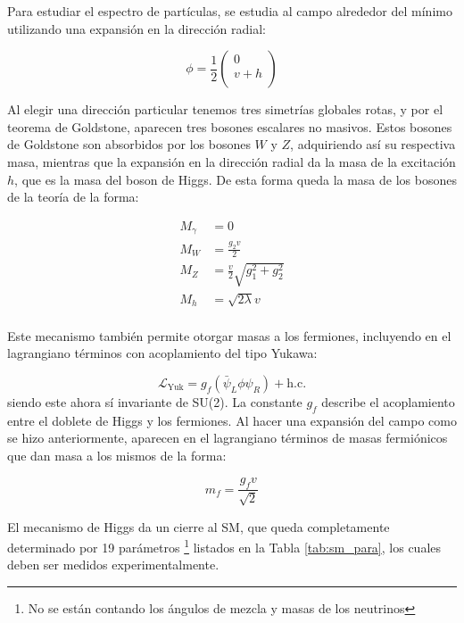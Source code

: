 Para estudiar el espectro de partículas, se estudia al campo alrededor del mínimo utilizando una expansión en la dirección radial:

\begin{equation}
	\phi = \frac{1}{2}
	\begin{pmatrix}
	0 \\
	v + h \\
	\end{pmatrix}
\end{equation}

Al elegir una dirección particular tenemos tres simetrías globales rotas, y por el teorema de Goldstone, aparecen tres bosones escalares no masivos. Estos bosones de Goldstone son absorbidos por los bosones $W$ y $Z$, adquiriendo así su respectiva masa, mientras que la expansión en la dirección radial da la masa de la excitación $h$, que es la masa del boson de Higgs. De esta forma queda la masa de los bosones de la teoría de la forma:

\begin{equation}
\begin{split}
	M_{\gamma} & = 0 \\
	M_{W} & = \frac{g_2 v}{2} \\
	M_{Z} & = \frac{v}{2}\sqrt{g_1^2 + g_2^2} \\
	M_{h} & = \sqrt{2\lambda}v \\
\end{split}
\end{equation}

Este mecanismo también permite otorgar masas a los fermiones, incluyendo en el lagrangiano términos con acoplamiento del tipo Yukawa:

\begin{equation}
	\mathcal{L}_{\text{Yuk}} = g_f(\bar{\psi}_L\phi \psi_R) + \text{h.c.}
\end{equation}
%
siendo este ahora sí invariante de SU(2). La constante $g_f$ describe el acoplamiento entre el doblete de Higgs y los fermiones. Al hacer una expansión del campo como se hizo anteriormente, aparecen en el lagrangiano términos de masas fermiónicos que dan masa a los mismos de la forma:

\begin{equation}
m_f = \frac{g_f v}{\sqrt{2}}
\end{equation}

El mecanismo de Higgs da un cierre al SM, que queda completamente determinado por 19 parámetros \footnote{No se están contando los ángulos de mezcla y masas de los neutrinos} listados en la Tabla \ref{tab:sm_para}, los cuales deben ser medidos experimentalmente.


